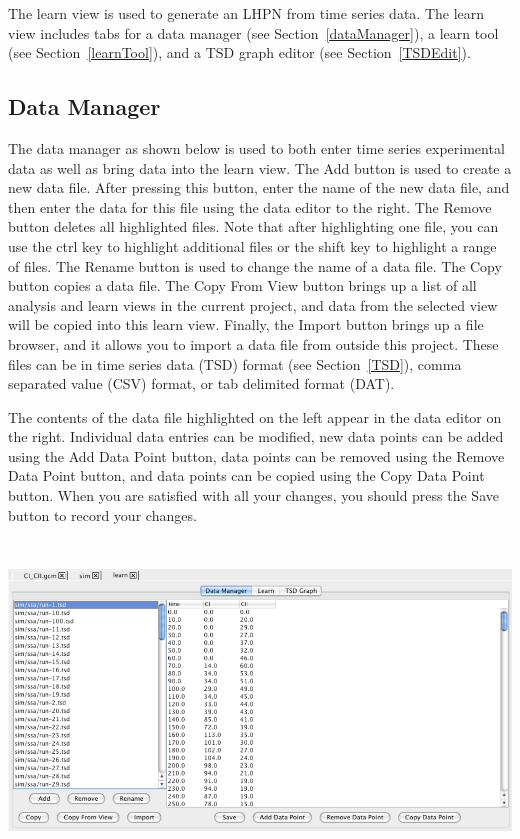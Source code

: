 \documentclass[titlepage,11pt]{article}
\begin{document}
\noindent
The learn view is used to generate an LHPN from time series data. The learn 
view includes tabs for a data manager (see Section~\ref{dataManager}), 
a learn tool (see Section~\ref{learnTool}), and a 
TSD graph editor (see Section~\ref{TSDEdit}).

\subsection{\label{dataManager}Data Manager}

\noindent
The data manager as shown below is used to both enter time series
experimental data as well as bring data
into the learn view.  The Add button is used to create a new data
file. After pressing this button, enter the name of the new data
file, and then enter the data for this file using the data editor
to the right.  The Remove button deletes all highlighted files.
Note that after highlighting one file, you can use the ctrl key
to highlight additional files or the shift key to highlight a
range of files.  The Rename button is used to change the name of a
data file. The Copy button copies a data file. The Copy From View
button brings up a list of all analysis and learn views in the
current project, and data from the selected view will be copied
into this learn view.  Finally, the Import button brings up a file
browser, and it allows you to import a data file from outside
this project.  These files can be in time series data (TSD) format
(see Section~\ref{TSD}), comma separated value (CSV) format, or tab
delimited format (DAT). 

The contents of the data file highlighted on the left appear in the
data editor on the right.  Individual data entries can be modified,
new data points can be added using the Add Data Point button, data 
points can be removed using the Remove Data Point button, and data
points can be copied using the Copy Data Point button.  When you are
satisfied with all your changes, you should press the Save button
to record your changes.
\begin{center}
\includegraphics[height=85mm]{screenshots/dataManager}
\end{center}
\end{document}
